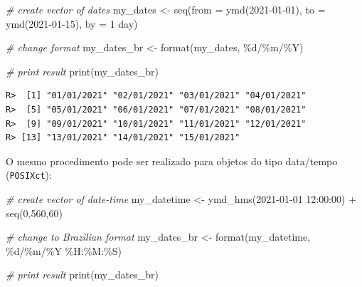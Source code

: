 \documentclass[
  11pt,
]{book}
\newenvironment{Shaded}{\begin{snugshade}}{\end{snugshade}}
\newcommand{\AttributeTok}[1]{\textcolor[rgb]{0.61,0.61,0.61}{#1}}
\newcommand{\CommentTok}[1]{\textcolor[rgb]{0.37,0.37,0.37}{\textit{#1}}}
\newcommand{\DecValTok}[1]{\textcolor[rgb]{0.06,0.06,0.06}{#1}}
\newcommand{\FunctionTok}[1]{\textcolor[rgb]{0,0,0}{#1}}
\newcommand{\NormalTok}[1]{#1}
\newcommand{\OtherTok}[1]{\textcolor[rgb]{0.37,0.37,0.37}{#1}}
\newcommand{\SpecialCharTok}[1]{\textcolor[rgb]{0,0,0}{#1}}
\newcommand{\StringTok}[1]{\textcolor[rgb]{0.5,0.5,0.5}{#1}}
\begin{document}
\begin{Shaded}
\begin{Highlighting}[]
\CommentTok{\# create vector of dates}
\NormalTok{my\_dates }\OtherTok{\textless{}{-}} \FunctionTok{seq}\NormalTok{(}\AttributeTok{from =} \FunctionTok{ymd}\NormalTok{(}\StringTok{\textquotesingle{}2021{-}01{-}01\textquotesingle{}}\NormalTok{),}
                \AttributeTok{to =} \FunctionTok{ymd}\NormalTok{(}\StringTok{\textquotesingle{}2021{-}01{-}15\textquotesingle{}}\NormalTok{),}
                \AttributeTok{by =} \StringTok{\textquotesingle{}1 day\textquotesingle{}}\NormalTok{)}

\CommentTok{\# change format}
\NormalTok{my\_dates\_br }\OtherTok{\textless{}{-}} \FunctionTok{format}\NormalTok{(my\_dates, }\StringTok{\textquotesingle{}\%d/\%m/\%Y\textquotesingle{}}\NormalTok{)}

\CommentTok{\# print result}
\FunctionTok{print}\NormalTok{(my\_dates\_br)}
\end{Highlighting}
\end{Shaded}

\begin{verbatim}
R>  [1] "01/01/2021" "02/01/2021" "03/01/2021" "04/01/2021"
R>  [5] "05/01/2021" "06/01/2021" "07/01/2021" "08/01/2021"
R>  [9] "09/01/2021" "10/01/2021" "11/01/2021" "12/01/2021"
R> [13] "13/01/2021" "14/01/2021" "15/01/2021"
\end{verbatim}

O mesmo procedimento pode ser realizado para objetos do tipo data/tempo (\texttt{POSIXct}):

\begin{Shaded}
\begin{Highlighting}[]
\CommentTok{\# create vector of date{-}time}
\NormalTok{my\_datetime }\OtherTok{\textless{}{-}} \FunctionTok{ymd\_hms}\NormalTok{(}\StringTok{\textquotesingle{}2021{-}01{-}01 12:00:00\textquotesingle{}}\NormalTok{) }\SpecialCharTok{+} \FunctionTok{seq}\NormalTok{(}\DecValTok{0}\NormalTok{,}\DecValTok{560}\NormalTok{,}\DecValTok{60}\NormalTok{)}

\CommentTok{\# change to Brazilian format}
\NormalTok{my\_dates\_br }\OtherTok{\textless{}{-}} \FunctionTok{format}\NormalTok{(my\_datetime, }\StringTok{\textquotesingle{}\%d/\%m/\%Y \%H:\%M:\%S\textquotesingle{}}\NormalTok{)}

\CommentTok{\# print result}
\FunctionTok{print}\NormalTok{(my\_dates\_br)}
\end{Highlighting}
\end{Shaded}
\end{document}
